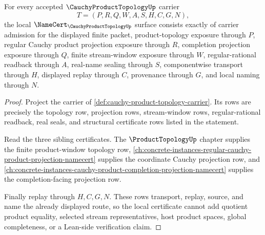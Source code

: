 \begin{theorem}
\label{thm:cauchy-product-topology-namecert-obligations}
For every accepted $\CauchyProductTopologyUp$ carrier
$$
T=(P,R,Q,W,A,S,H,C,G,N),
$$
the local $\NameCert_{\CauchyProductTopologyUp}$ surface consists exactly of carrier admission for the displayed finite packet, product-topology exposure through $P$, regular Cauchy product projection exposure through $R$, completion projection exposure through $Q$, finite stream-window exposure through $W$, regular-rational readback through $A$, real-name sealing through $S$, componentwise transport through $H$, displayed replay through $C$, provenance through $G$, and local naming through $N$.
\end{theorem}
\begin{proof}
Project the carrier of \autoref{def:cauchy-product-topology-carrier}. Its rows are precisely the topology row, projection rows, stream-window rows, regular-rational readback, real seals, and structural certificate rows listed in the statement.

Read the three sibling certificates. The $\ProductTopologyUp$ chapter supplies the finite product-window topology row, \autoref{ch:concrete-instances-regular-cauchy-product-projection-namecert} supplies the coordinate Cauchy projection row, and \autoref{ch:concrete-instances-cauchy-product-completion-projection-namecert} supplies the completion-facing projection row.

Finally replay through $H,C,G,N$. These rows transport, replay, source, and name the already displayed route, so the local certificate cannot add quotient product equality, selected stream representatives, host product spaces, global completeness, or a Lean-side verification claim.
\end{proof}

